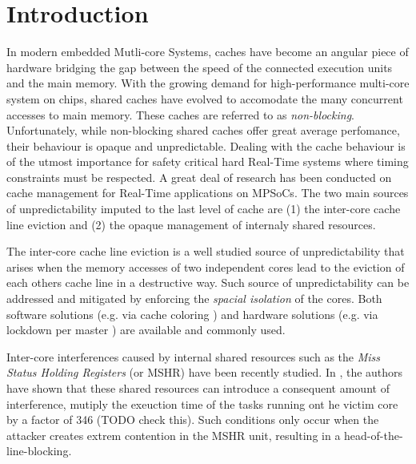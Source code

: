 \section{Introduction}
    In modern embedded Mutli-core Systems, caches have become an angular piece of hardware bridging the gap between the speed of the connected execution units and the main memory. With the growing demand for high-performance multi-core system on chips, shared caches have evolved to accomodate the many concurrent accesses to main memory. These caches are referred to as \emph{non-blocking}.\\

    Unfortunately, while non-blocking shared caches offer great average perfomance, their behaviour is opaque and unpredictable. Dealing with the cache behaviour is of the utmost importance for safety critical hard Real-Time systems where timing constraints must be respected. A great deal of research has been conducted on cache management for Real-Time applications on MPSoCs. The two main sources of unpredictability imputed to the last level of cache are (1) the inter-core cache line eviction and (2) the opaque management of internaly shared resources.

    The inter-core cache line eviction is a well studied source of unpredictability that arises when the memory accesses of two independent cores lead to the eviction of each others cache line in a destructive way. Such source of unpredictability can be addressed and mitigated by enforcing the \emph{spacial isolation} of the cores. Both software solutions (e.g. via cache coloring \cite{}) and hardware solutions (e.g. via lockdown per master \cite{Giovani_cahe_partitioning_survey}) are available and commonly used.

    Inter-core interferences caused by internal shared resources such as the \emph{Miss Status Holding Registers} (or MSHR) have been recently studied. In \cite{Heechul_taming_non_blocking_caches} \cite{Heechul_DDOS_attacks_on_shared_cache}, the authors have shown that these shared resources can introduce a consequent amount of interference, mutiply the exeuction time of the tasks running ont he victim core by a factor of 346 (TODO check this). Such conditions only occur when the attacker creates extrem contention in the MSHR unit, resulting in a head-of-the-line-blocking.\\


